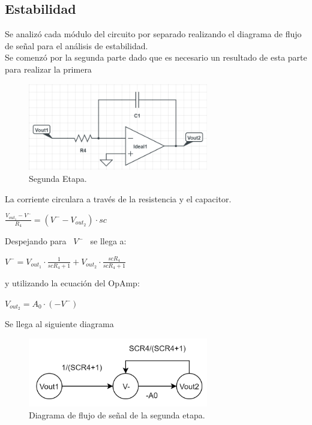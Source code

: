 \subsection{Estabilidad}
Se analizó cada módulo del circuito por separado realizando el diagrama de flujo de señal para el análisis de estabilidad.\\
Se comenzó por la segunda parte dado que es necesario un resultado de esta parte para realizar la primera

\begin{figure}[htb]	
	\centering
	\includegraphics[width=0.7\textwidth]{Ej3/imagenes/SegundaEtapa.PNG}
	\caption{Segunda Etapa.}
	\label{fig:SegundaEtapa}
\end{figure}
La corriente circulara a través de la resistencia y el capacitor.\\
\begin{center}
$ \frac{V_{out_1}-V^-}{R_4} = (V^--V_{out_2})\cdot sc$ \\
\end{center}
 Despejando para \ $V^-$ \ se llega a: \\
\begin{center}
$V^- = V_{out_1} \cdot \frac{1}{scR_4+1}+V_{out_2} \cdot \frac{scR_4}{scR_4+1}$\\\end{center}
y utilizando la ecuación del OpAmp:\\
\begin{center}
$V_{out_2}=A_0 \cdot (-V^-)$
\end{center}
Se llega al siguiente diagrama
\begin{figure}[H]	
	\centering
	\includegraphics[width=0.7\textwidth]{Ej3/imagenes/SegundaEtapaDiagrama.PNG}
	\caption{Diagrama de flujo de señal de la segunda etapa.}
	\label{fig:SegundaEtapaDiagrama}
\end{figure}
